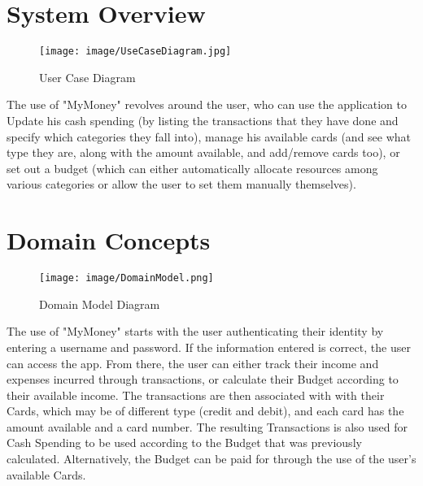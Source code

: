 \documentclass[12pt]{article}
\begin{document}
\section{System Overview}
\begin{figure}[h!]
\texttt{[image: image/UseCaseDiagram.jpg]} \\

 \caption{User Case Diagram}
 
 
 \end{figure}
 The use of "MyMoney" revolves around the user, who can use the application to Update his cash spending (by listing the transactions that they have done and specify which categories they fall into), manage his available cards (and see what type they are, along with the amount available, and add/remove cards too), or set out a budget (which can either automatically allocate resources among various categories or allow the user to set them manually themselves). \\

\section{Domain Concepts}
 \begin{figure}[h!]
\texttt{[image: image/DomainModel.png]}\\
 
\caption{Domain Model Diagram}
 
 
 \end{figure}
    The use of "MyMoney" starts with the user authenticating their identity by entering a username and password. If the information entered is correct, the user can access the app. From there, the user can either track their income and expenses incurred through transactions, or calculate their Budget according to their available income. The transactions are then associated with with their Cards, which may be of different type (credit and debit), and each card has the amount available and a card number. The resulting Transactions is also used for Cash Spending to be used according to the Budget that was previously calculated. Alternatively, the Budget can be paid for through the use of the user's available Cards.\\
\end{document}
